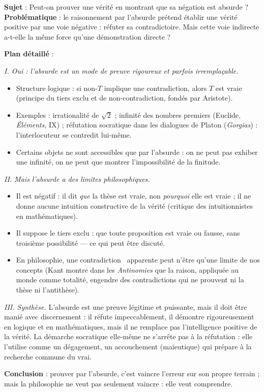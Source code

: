 \documentclass[11pt]{article}
\begin{document}
\begin{exoresolu}
\textbf{Sujet} : Peut-on prouver une vérité en montrant que sa négation est absurde ?
\tcblower
\textbf{Problématique} : le raisonnement par l'absurde prétend établir une vérité positive par une voie négative : réfuter sa contradictoire. Mais cette voie indirecte a-t-elle la même force qu'une démonstration directe ?

\textbf{Plan détaillé} :

\emph{I. Oui : l'absurde est un mode de preuve rigoureux et parfois irremplaçable.}
\begin{itemize}
\item Structure logique : si non-$T$ implique une contradiction, alors $T$ est vraie (principe du tiers exclu et de non-contradiction, fondés par Aristote).
\item Exemples : irrationalité de $\sqrt{2}$ ; infinité des nombres premiers (Euclide, \emph{Éléments}, IX) ; réfutation socratique dans les dialogues de Platon (\emph{Gorgias}) : l'interlocuteur se contredit lui-même.
\item Certains objets ne sont accessibles que par l'absurde : on ne peut pas exhiber une infinité, on ne peut que montrer l'impossibilité de la finitude.
\end{itemize}

\emph{II. Mais l'absurde a des limites philosophiques.}
\begin{itemize}
\item Il est négatif : il dit \emph{que} la thèse est vraie, non \emph{pourquoi} elle est vraie ; il ne donne aucune intuition constructive de la vérité (critique des intuitionnistes en mathématiques).
\item Il suppose le tiers exclu : que toute proposition est vraie ou fausse, sans troisième possibilité — ce qui peut être discuté.
\item En philosophie, une \guillemotleft contradiction \guillemotright\ apparente peut n'être qu'une limite de nos concepts (Kant montre dans les \emph{Antinomies} que la raison, appliquée au monde comme totalité, engendre des contradictions qui ne prouvent ni la thèse ni l'antithèse).
\end{itemize}

\emph{III. Synthèse.} L'absurde est une preuve légitime et puissante, mais il doit être manié avec discernement : il réfute impeccablement, il démontre rigoureusement en logique et en mathématiques, mais il ne remplace pas l'intelligence positive de la vérité. La démarche socratique elle-même ne s'arrête pas à la réfutation : elle l'utilise comme un dégagement, un accouchement (maïeutique) qui prépare à la recherche commune du vrai.

\textbf{Conclusion} : prouver par l'absurde, c'est vaincre l'erreur sur son propre terrain ; mais la philosophie ne veut pas seulement vaincre : elle veut comprendre.
\end{exoresolu}
\end{document}
